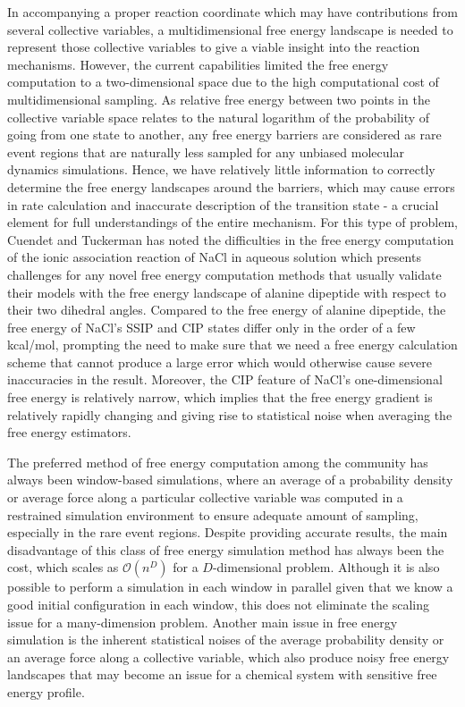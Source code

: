 \begin{spacing}{2.0}
    In accompanying a proper reaction coordinate which may have contributions from several collective variables, a multidimensional free energy 
    landscape is needed to represent those collective variables to give a viable insight into the reaction mechanisms. However, the current capabilities 
    limited the free energy computation to a two-dimensional space due to the high computational cost of multidimensional sampling. As relative 
    free energy between two points in the collective variable space relates to the natural logarithm of the probability of going from one state to 
    another, any free energy barriers are considered as rare event regions that are naturally less sampled for any unbiased molecular dynamics 
    simulations. Hence, we have relatively little information to correctly determine the free energy landscapes around the barriers, which may 
    cause errors in rate calculation and inaccurate description of the transition state - a crucial element for full understandings of the entire 
    mechanism. For this type of problem, Cuendet and Tuckerman has noted the difficulties in the free energy computation of the ionic association 
    reaction of NaCl in aqueous solution which presents challenges for any novel free energy computation methods that usually validate their models 
    with the free energy landscape of alanine dipeptide with respect to their two dihedral angles. Compared to the free energy of alanine dipeptide, 
    the free energy of NaCl's SSIP and CIP states differ only in the order of a few kcal/mol, prompting the need to make sure that we need a free 
    energy calculation scheme that cannot produce a large error which would otherwise cause severe inaccuracies in the result. Moreover, the CIP 
    feature of NaCl's one-dimensional free energy is relatively narrow, which implies that the free energy gradient is relatively rapidly changing 
    and giving rise to statistical noise when averaging the free energy estimators. \cite{P-JCTC-2014-v10-Cuendet}

    The preferred method of free energy computation among the community has always been window-based simulations, where an average of a probability 
    density or average force along a particular collective variable was computed in a restrained simulation environment to ensure adequate amount of 
    sampling, especially in the rare event regions. Despite providing accurate results, the main disadvantage of this class of free energy simulation 
    method has always been the cost, which scales as $\mathcal{O}(n^D)$ for a $D$-dimensional problem. Although it is also possible to perform a 
    simulation in each window in parallel given that we know a good initial configuration in each window, this does not eliminate the scaling issue 
    for a many-dimension problem. \cite{P-JCTC-2013-v9-Wojtas-Niziurski} Another main issue in free energy simulation is the inherent statistical 
    noises of the average probability density or an average force along a collective variable, which also produce noisy free energy landscapes that 
    may become an issue for a chemical system with sensitive free energy profile. 


\end{spacing}
